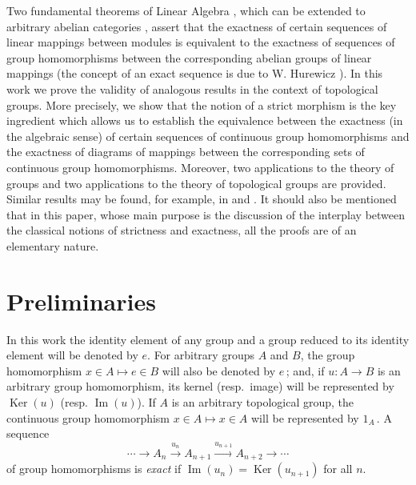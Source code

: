 \documentclass[12pt]{amsart}
\theoremstyle{theorem}
\theoremstyle{definition}
\theoremstyle{remark} \theoremstyle{question} \theoremstyle{example}
\def\Ker{\operatorname{{Ker}}}
\def\mI{\operatorname{{Im}}}
\begin{document}
Two fundamental theorems of Linear Algebra
\cite[p.\ 57 and p.\ 59]{Bourbaki1},
which can be extended to arbitrary abelian categories
\cite[p.\ 128]{Grothendieck1},
assert that the exactness of certain sequences of linear mappings between
modules is equivalent to the exactness of sequences of group homomorphisms
between the corresponding abelian groups of linear mappings (the concept
of an exact sequence is due to W. Hurewicz \cite{Hurewicz}). In this work
we prove the validity of analogous results in the context of topological
groups. More precisely, we show that the notion of a strict morphism is the key ingredient which allows us
to establish the equivalence between the exactness (in the algebraic sense)
of certain sequences of continuous group homomorphisms and the exactness of
diagrams of mappings between the corresponding sets of continuous group
homomorphisms. Moreover, two applications to the theory of groups and two
applications to the theory of topological groups are provided. Similar
results may be found, for example, in \cite[II, p.\ 50]{Bourbaki2} and
\cite[p.\ 23]{Palamodov}. It should also be mentioned that in this paper,
whose main purpose is the discussion of the interplay between the classical
notions of strictness and exactness, all the proofs are of an elementary
nature.




\section{Preliminaries}

In this work the identity element of any group and a group reduced to its
identity element will be denoted by $e$. For arbitrary groups $A$ and $B$,
the group homomorphism $x \in A \mapsto e \in B$ will also be denoted by
$e$\,; and, if $u\colon A \to B$ is an arbitrary group homomorphism, its
kernel (resp.\ image) will be represented by $\Ker(u)$ (resp. $\mI(u)$).
If $A$ is an arbitrary topological group, the continuous group homomorphism
$x \in A \mapsto x \in A$ will be represented by $1_A$\,. A sequence
$$
\cdots \longrightarrow A_n \overset{u_n}{\longrightarrow}
  A_{n+1} \overset{u_{n+1}}{\longrightarrow} A_{n+2} \longrightarrow \cdots
$$
of group homomorphisms is \textit{exact\/} \cite[p.\ 15]{Lang} if
$\mI(u_n) = \Ker(u_{n+1})$ for all $n$.
\end{document}
